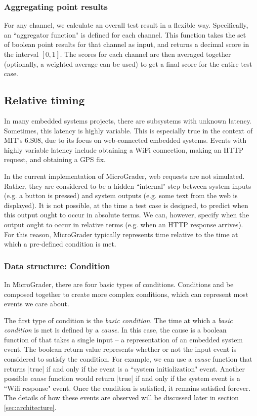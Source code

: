 \documentclass[12pt]{article}
\begin{document}
\subsubsection{Aggregating point results}
For any channel, we calculate an overall test result in a flexible way.  Specifically, an ``aggregator function" is defined for each channel.  This function takes the set of boolean point results for that channel as input, and returns a decimal score in the interval $[0,1]$.  The scores for each channel are then averaged together (optionally, a weighted average can be used) to get a final score for the entire test case.

\subsection{Relative timing}
In many embedded systems projects, there are subsystems with unknown latency.  Sometimes, this latency is highly variable.  This is especially true in the context of MIT's 6.S08, due to its focus on web-connected embedded systems.  Events with highly variable latency include obtaining a WiFi connection, making an HTTP request, and obtaining a GPS fix.

In the current implementation of MicroGrader, web requests are not simulated.  Rather, they are considered to be a hidden ``internal" step between system inputs (e.g. a button is pressed) and system outputs (e.g. some text from the web is displayed).  It is not possible, at the time a test case is designed, to predict when this output ought to occur in absolute terms.  We can, however, specify when the output ought to occur in relative terms (e.g. when an HTTP response arrives).  For this reason, MicroGrader typically represents time relative to the time at which a pre-defined condition is met.

\subsubsection{Data structure: Condition}
\label{sec:condition}
In MicroGrader, there are four basic types of conditions.  Conditions and be composed together to create more complex conditions, which can represent most events we care about.

The first type of condition is the \textit{basic condition}.  The time at which a \textit{basic condition} is met is defined by a \textit{cause}.  In this case, the cause is a boolean function of that takes a single input -- a representation of an embedded system event.  The boolean return value represents whether or not the input event is considered to satisfy the condition.  For example, we can use a \textit{cause} function that returns |true| if and only if the event is a ``system initialization" event.  Another possible \textit{cause} function would return |true| if and only if the system event is a ``Wifi response" event.  Once the condition is satisfied, it remains satisfied forever.  The details of how these events are observed will be discussed later in section \ref{sec:architecture}. 
\end{document}
